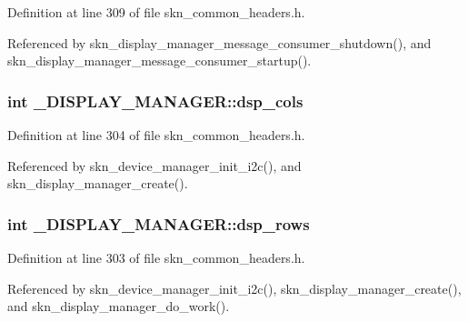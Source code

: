Definition at line 309 of file skn\+\_\+common\+\_\+headers.\+h.



Referenced by skn\+\_\+display\+\_\+manager\+\_\+message\+\_\+consumer\+\_\+shutdown(), and skn\+\_\+display\+\_\+manager\+\_\+message\+\_\+consumer\+\_\+startup().

\hypertarget{struct___d_i_s_p_l_a_y___m_a_n_a_g_e_r_a8ea0b9503de7da47f210489c8fa19867}{
\subsubsection[{dsp\+\_\+cols}]{\setlength{\rightskip}{0pt plus 5cm}int \+\_\+\+D\+I\+S\+P\+L\+A\+Y\+\_\+\+M\+A\+N\+A\+G\+E\+R\+::dsp\+\_\+cols}}\label{struct___d_i_s_p_l_a_y___m_a_n_a_g_e_r_a8ea0b9503de7da47f210489c8fa19867}


Definition at line 304 of file skn\+\_\+common\+\_\+headers.\+h.



Referenced by skn\+\_\+device\+\_\+manager\+\_\+init\+\_\+i2c(), and skn\+\_\+display\+\_\+manager\+\_\+create().

\hypertarget{struct___d_i_s_p_l_a_y___m_a_n_a_g_e_r_aeddcffcc90a611efde00a085352bc63b}{
\subsubsection[{dsp\+\_\+rows}]{\setlength{\rightskip}{0pt plus 5cm}int \+\_\+\+D\+I\+S\+P\+L\+A\+Y\+\_\+\+M\+A\+N\+A\+G\+E\+R\+::dsp\+\_\+rows}}\label{struct___d_i_s_p_l_a_y___m_a_n_a_g_e_r_aeddcffcc90a611efde00a085352bc63b}


Definition at line 303 of file skn\+\_\+common\+\_\+headers.\+h.



Referenced by skn\+\_\+device\+\_\+manager\+\_\+init\+\_\+i2c(), skn\+\_\+display\+\_\+manager\+\_\+create(), and skn\+\_\+display\+\_\+manager\+\_\+do\+\_\+work().

